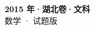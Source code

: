 \documentclass[zihao=-4, a4paper]{ctexart}
\begin{document}
\begin{center}
  {\Large\bfseries 2015 年·湖北卷·文科}\\[4pt]
  {\large 数学 · 试题版}
\end{center}
\medskip
{}

\end{document}
